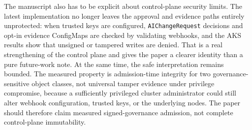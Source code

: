 The manuscript also has to be explicit about control-plane security limits. The latest implementation no longer leaves the approval and evidence paths entirely unprotected: when trusted keys are configured, \texttt{AIChangeRequest} decisions and opt-in evidence ConfigMaps are checked by validating webhooks, and the AKS results show that unsigned or tampered writes are denied. That is a real strengthening of the control plane and gives the paper a clearer identity than a pure future-work note. At the same time, the safe interpretation remains bounded. The measured property is admission-time integrity for two governance-sensitive object classes, not universal tamper evidence under privilege compromise, because a sufficiently privileged cluster administrator could still alter webhook configuration, trusted keys, or the underlying nodes. The paper should therefore claim measured signed-governance admission, not complete control-plane immutability.
